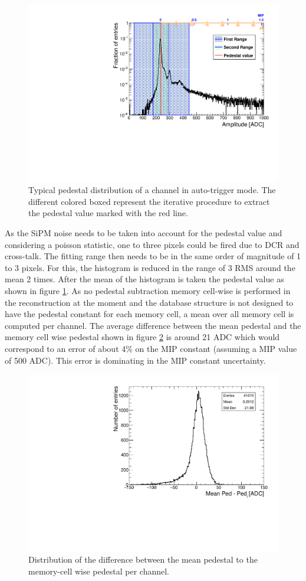 \begin{figure}[htbp!]
	\centering
	\includegraphics[width=0.7\linewidth]{../Thesis_Plots/EnergyCalib/Plots/PedestalExtractionExample.pdf}
	\caption{Typical pedestal distribution of a channel in auto-trigger mode. The different colored boxed represent the iterative procedure to extract the pedestal value marked with the red line.} \label{fig:PedExtraction}
\end{figure}

As the SiPM noise needs to be taken into account for the pedestal value and considering a poisson statistic, one to three pixels could be fired due to DCR and cross-talk. The fitting range then needs to be in the same order of magnitude of 1 to 3 pixels. For this, the histogram is reduced in the range of 3 RMS around the mean 2 times. After the mean of the histogram is taken the pedestal value as shown in figure \ref{fig:PedExtraction}. As no pedestal subtraction memory cell-wise is performed in the reconstruction at the moment and the database structure is not designed to have the pedestal constant for each memory cell, a mean over all memory cell is computed per channel. The average difference between the mean pedestal and the memory cell wise pedestal shown in figure \ref{fig:CompMeanMem} is around 21 ADC which would correspond to an error of about 4\% on the MIP constant (assuming a MIP value of 500 ADC). This error is dominating in the MIP constant uncertainty.

\begin{figure}[htbp!]
	\centering
	\includegraphics[width=0.7\linewidth]{../Thesis_Plots/EnergyCalib/Plots/ComparisonMeanPedtoMemorycell.pdf}
	\caption{Distribution of the difference between the mean pedestal to the memory-cell wise pedestal per channel.} \label{fig:CompMeanMem}
\end{figure}

